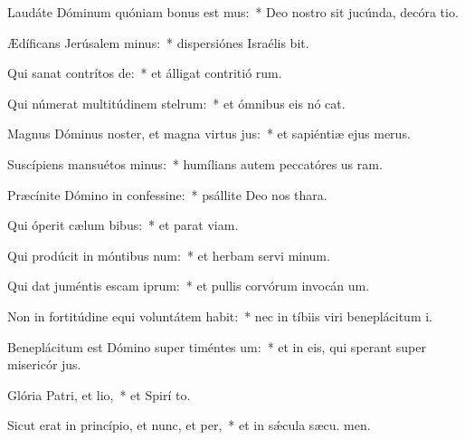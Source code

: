 \item Laudáte Dóminum quóniam bonus est mus:~* Deo nostro sit jucúnda, decóra tio.
\item Ædíficans Jerúsalem minus:~* dispersiónes Israélis bit.
\item Qui sanat contrítos de:~* et álligat contritió rum.
\item Qui númerat multitúdinem stelrum:~* et ómnibus eis nó cat.
\item Magnus Dóminus noster, et magna virtus jus:~* et sapiéntiæ ejus   merus.
\item Suscípiens mansuétos minus:~* humílians autem peccatóres us  ram.
\item Præcínite Dómino in confessine:~* psállite Deo nos  thara.
\item Qui óperit cælum bibus:~* et parat  viam.
\item Qui prodúcit in móntibus num:~* et herbam servi minum.
\item Qui dat juméntis escam iprum:~* et pullis corvórum invocán um.
\item Non in fortitúdine equi voluntátem habit:~* nec in tíbiis viri beneplácitum  i.
\item Beneplácitum est Dómino super timéntes um:~* et in eis, qui sperant super misericór jus.
\item Glória Patri, et lio,~* et Spirí to.
\item Sicut erat in princípio, et nunc, et per,~* et in sǽcula sæcu. men.
